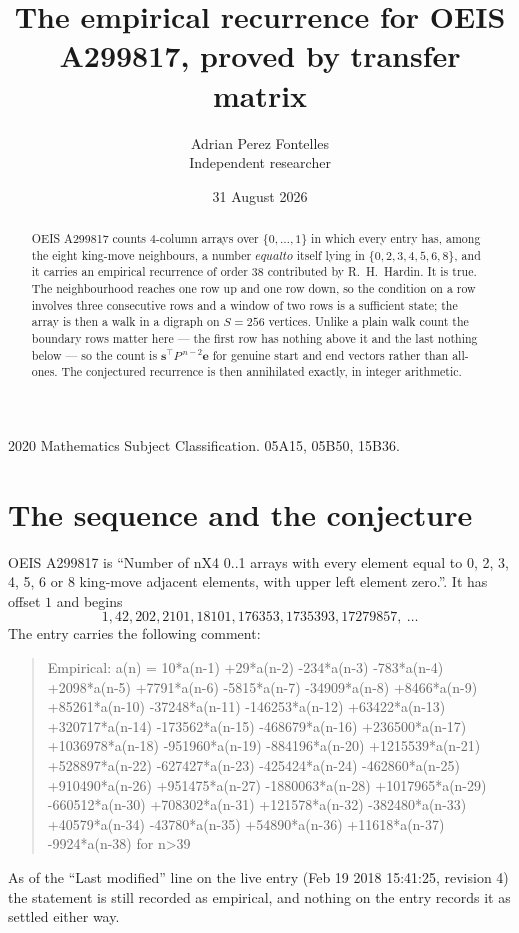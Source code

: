 \documentclass[11pt,a4paper]{article}
\title{The empirical recurrence for OEIS A299817, proved by transfer matrix}
\author{Adrian Perez Fontelles\\ \small Independent researcher}
\date{31 August 2026}
\theoremstyle{plain}
\theoremstyle{definition}
\begin{document}
\maketitle

\begin{abstract}
OEIS A299817 counts $4$-column arrays over $\{0,\dots,1\}$ in which every entry has,
among the eight king-move neighbours, a number $equal to$ itself lying in $\{0,2,3,4,5,6,8\}$, and it carries an empirical
recurrence of order $38$ contributed by R.~H.~Hardin. It is true. The neighbourhood
reaches one row up and one row down, so the condition on a row involves three consecutive
rows and a window of two rows is a sufficient state; the array is then a walk in a digraph
on $S=256$ vertices. Unlike a plain walk count the boundary rows matter here --- the first
row has nothing above it and the last nothing below --- so the count is
$\mathbf{s}^{\!\top}P^{\,n-2}\mathbf{e}$ for genuine start and end vectors rather than
all-ones. The conjectured recurrence is then annihilated exactly, in integer arithmetic.
\end{abstract}

\noindent\small 2020 Mathematics Subject Classification. 05A15, 05B50, 15B36.\normalsize

\section{The sequence and the conjecture}

OEIS A299817 is ``Number of nX4 0..1 arrays with every element equal to 0, 2, 3, 4, 5, 6 or 8 king-move adjacent elements, with upper left element zero.''. It has offset
$1$ and begins
\[
1, 42, 202, 2101, 18101, 176353, 1735393, 17279857,\ \dots
\]
The entry carries the following comment:
\begin{quote}\small
Empirical: a(n) = 10*a(n-1) +29*a(n-2) -234*a(n-3) -783*a(n-4) +2098*a(n-5) +7791*a(n-6) -5815*a(n-7) -34909*a(n-8) +8466*a(n-9) +85261*a(n-10) -37248*a(n-11) -146253*a(n-12) +63422*a(n-13) +320717*a(n-14) -173562*a(n-15) -468679*a(n-16) +236500*a(n-17) +1036978*a(n-18) -951960*a(n-19) -884196*a(n-20) +1215539*a(n-21) +528897*a(n-22) -627427*a(n-23) -425424*a(n-24) -462860*a(n-25) +910490*a(n-26) +951475*a(n-27) -1880063*a(n-28) +1017965*a(n-29) -660512*a(n-30) +708302*a(n-31) +121578*a(n-32) -382480*a(n-33) +40579*a(n-34) -43780*a(n-35) +54890*a(n-36) +11618*a(n-37) -9924*a(n-38) for n>39
\end{quote}
As of the ``Last modified'' line on the live entry (Feb 19 2018 15:41:25, revision
4) the statement is still recorded as empirical, and nothing on the entry
records it as settled either way.
\end{document}
